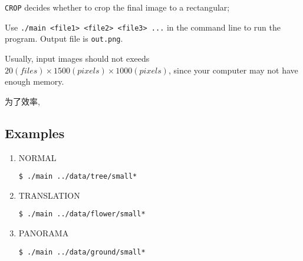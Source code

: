 \verb|CROP| decides whether to crop the final image to a rectangular;

Use \verb|./main <file1> <file2> <file3> ...| in the command line to run the program.
Output file is \verb|out.png|.

Usually, input images should not exeeds $20(files)\times 1500(pixels) \times 1000(pixels)$, since your computer may not have enough memory.

为了效率,

\subsection{Examples}
\begin{enumerate}
    \item NORMAL
\begin{lstlisting}
$ ./main ../data/tree/small*
\end{lstlisting}

\item TRANSLATION
  \begin{lstlisting}
$ ./main ../data/flower/small*
  \end{lstlisting}

  \item PANORAMA
    \begin{lstlisting}
$ ./main ../data/ground/small*
    \end{lstlisting}
\end{enumerate}
